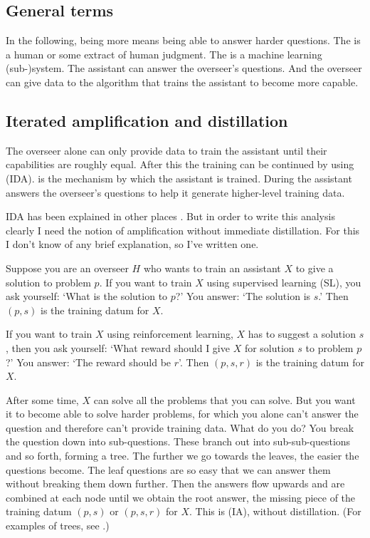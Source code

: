 \documentclass{farlamp}
\begin{document}
\subsection{General terms}

In the following, being more  means being able to answer harder
questions. The  is a human or some extract of human judgment. The
 is a machine learning (sub-)system. The assistant can answer
the overseer's questions. And the overseer can give data to the algorithm
that trains the assistant to become more capable.


\subsection{Iterated amplification and distillation}
\label{sec:iad}

The overseer alone can only provide data to train the assistant until their
capabilities are roughly equal. After this the training can be continued by
using  (IDA). 
is the mechanism by which the assistant is trained. During 
the assistant answers the overseer's questions to help it generate higher-level
training data.

IDA has been explained in other places \parencite{CotrIDA, ESSMLPIDA}. But in
order to write this analysis clearly I need the notion of amplification without
immediate distillation. For this I don't know of any brief explanation, so I've
written one.

Suppose you are an overseer $H$ who wants to train an assistant $X$
\parencite[symbols taken from][]{CSASupAmp} to give a solution to problem $p$.
If you want to train $X$ using supervised learning (SL), you ask yourself: ‘What
is the solution to $p$?’ You answer: ‘The solution is $s$.’ Then $(p, s)$ is the
training datum for $X$.

If you want to train $X$ using reinforcement learning, $X$ has to suggest a
solution $s$, then you ask yourself: ‘What reward should I give $X$ for solution
$s$ to problem $p$?’ You answer: ‘The reward should be $r$’. Then $(p, s, r)$ is
the training datum for $X$.

After some time, $X$ can solve all the problems that you can solve. But you want
it to become able to solve harder problems, for which you alone can't answer the
question and therefore can't provide training data. What do you do? You break
the question down into sub-questions. These branch out into sub-sub-questions
and so forth, forming a tree. The further we go towards the leaves, the easier
the questions become. The leaf questions are so easy that we can answer them
without breaking them down further. Then the answers flow upwards and are
combined at each node until we obtain the root answer, the missing piece of the
training datum $(p, s)$ or $(p, s, r)$ for $X$. This is  (IA), without distillation. (For examples of trees, see
\textcite{StuhFacCog}.)
\end{document}
